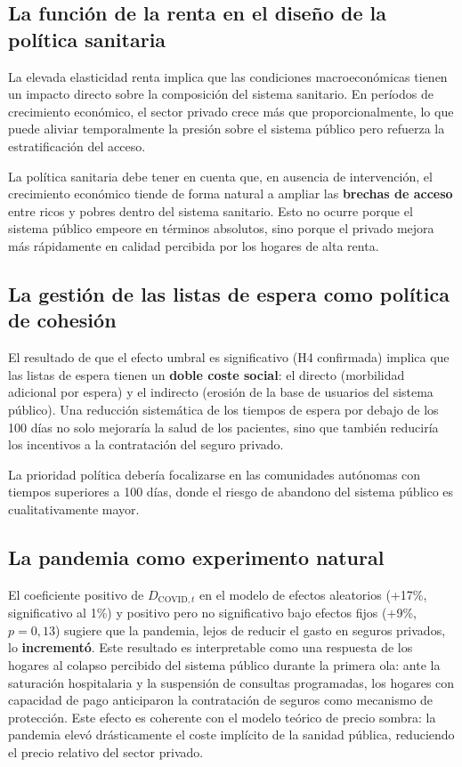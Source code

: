 \subsection{La función de la renta en el diseño de la política sanitaria}

La elevada elasticidad renta implica que las condiciones macroeconómicas tienen
un impacto directo sobre la composición del sistema sanitario. En períodos de
crecimiento económico, el sector privado crece más que proporcionalmente, lo que
puede aliviar temporalmente la presión sobre el sistema público pero refuerza
la estratificación del acceso.

La política sanitaria debe tener en cuenta que, en ausencia de intervención,
el crecimiento económico tiende de forma natural a ampliar las
\textbf{brechas de acceso} entre ricos y pobres dentro del sistema sanitario.
Esto no ocurre porque el sistema público empeore en términos absolutos, sino
porque el privado mejora más rápidamente en calidad percibida por los hogares de
alta renta.

\subsection{La gestión de las listas de espera como política de cohesión}

El resultado de que el efecto umbral es significativo (H4 confirmada) implica que
las listas de espera tienen un \textbf{doble coste social}: el directo (morbilidad
adicional por espera) y el indirecto (erosión de la base de usuarios del sistema
público). Una reducción sistemática de los tiempos de espera por debajo de los
100 días no solo mejoraría la salud de los pacientes, sino que también reduciría
los incentivos a la contratación del seguro privado.

La prioridad política debería focalizarse en las comunidades autónomas con
tiempos superiores a 100 días, donde el riesgo de abandono del sistema público
es cualitativamente mayor.

\subsection{La pandemia como experimento natural}

El coeficiente positivo de $D_{\text{COVID},t}$ en el modelo de efectos aleatorios
(+17\%, significativo al 1\%) y positivo pero no significativo bajo efectos fijos
(+9\%, $p = 0{,}13$) sugiere que la pandemia, lejos de reducir el gasto
en seguros privados, lo \textbf{incrementó}. Este resultado es interpretable como
una respuesta de los hogares al colapso percibido del sistema público durante la
primera ola: ante la saturación hospitalaria y la suspensión de consultas
programadas, los hogares con capacidad de pago anticiparon la contratación de
seguros como mecanismo de protección. Este efecto es coherente con el modelo
teórico de precio sombra: la pandemia elevó drásticamente el coste implícito de
la sanidad pública, reduciendo el precio relativo del sector privado.


